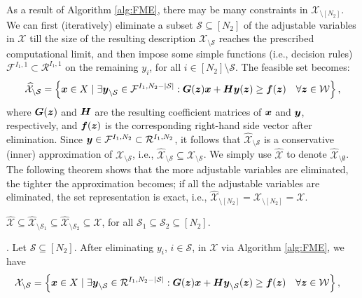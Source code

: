 \documentclass[fleqn,mnsc,blindrev]{informs4}
\newcommand{\mb}[1]{\mbox{\boldmath \ensuremath{#1}}}
\begin{document}
	
	As a result of Algorithm \ref{alg:FME}, there may be many constraints in $\mathcal{X}_{\setminus [N_2]}$.  We can first (iteratively) eliminate a subset $\mathcal{S}\subseteq [N_2]$ of the adjustable variables in $\mathcal{X}$ till the size of the resulting description $\mathcal{X}_{\setminus \mathcal{S}}$ reaches the prescribed computational limit, and then impose some simple functions (i.e.,  decision rules)  $\mathcal{F}^{I_1,1} \subset \mathcal{R}^{I_1,1}$ on the remaining $y_i$, for all $i \in [N_2]\setminus \mathcal{S}$. The feasible set becomes:
\begin{equation*}
	\widehat{\mathcal{X}}_{\setminus \mathcal{S}} = \left\{ \mb{x} \in X \hspace{3pt} | \hspace{3pt} \exists  \mb{y}_{\setminus \mathcal{S}} \in \mathcal{F}^{I_1,N_2-|\mathcal{S}|}: \mb{G}(\mb{z})\mb{x}+\mb{H}\mb{y}(\mb{z}) \geq \mb{f}(\mb{z}) \quad \forall \mb{z} \in \mathcal{W} \right\},
\end{equation*}
	where $\mb{G}(\mb{z})$ and $\mb{H}$ are the resulting coefficient matrices of $\mb{x}$ and $\mb{y}$, respectively, and $\mb{f}(\mb{z})$ is the corresponding right-hand side vector after elimination. Since $\mb{y} \in \mathcal{F}^{I_1,N_2} \subset \mathcal{R}^{I_1,N_2}$, it follows that $\widehat{\mathcal{X}}_{\setminus \mathcal{S}} $ is a conservative (inner) approximation of $\mathcal{X}_{\setminus \mathcal{S}}$, i.e., $\widehat{\mathcal{X}}_{\setminus \mathcal{S}} \subseteq \mathcal{X}_{\setminus \mathcal{S}}$. We simply use $\widehat{\mathcal{X}}$ to denote $\widehat{\mathcal{X}}_{\setminus \emptyset}$. The following theorem shows that the more adjustable variables are eliminated, the tighter the approximation becomes; if all the adjustable variables are eliminated, the set representation is exact, i.e., $\widehat{\mathcal{X}}_{\setminus [N_2]} = \mathcal{X}_{\setminus [N_2]}= \mathcal{X}$. 
	\begin{theorem} \label{thm:subset}
		$\widehat{\mathcal{X}}\subseteq\widehat{\mathcal{X}}_{\setminus \mathcal{S}_1} \subseteq \widehat{\mathcal{X}}_{\setminus \mathcal{S}_2} \subseteq \mathcal{X}$, for all $\mathcal{S}_1 \subseteq \mathcal{S}_2 \subseteq [N_2]$.
	\end{theorem} 
	. Let $\mathcal{S} \subseteq [N_2]$. After eliminating $y_i$, $i \in \mathcal{S}$, in $\mathcal{X}$ via Algorithm \ref{alg:FME}, we have 
\begin{align*}
		\mathcal{X}_{\setminus \mathcal{S}} & = \left\{ \mb{x} \in X \hspace{3pt} | \hspace{3pt} \exists \mb{y}_{\setminus \mathcal{S}} \in \mathcal{R}^{I_1,N_2-|\mathcal{S}|}: \mb{G}(\mb{z})\mb{x}+\mb{H}\mb{y}_{\setminus \mathcal{S}}(\mb{z}) \geq \mb{f}(\mb{z})  \quad \forall \mb{z} \in \mathcal{W}  \right\},
\end{align*}
\end{document}
